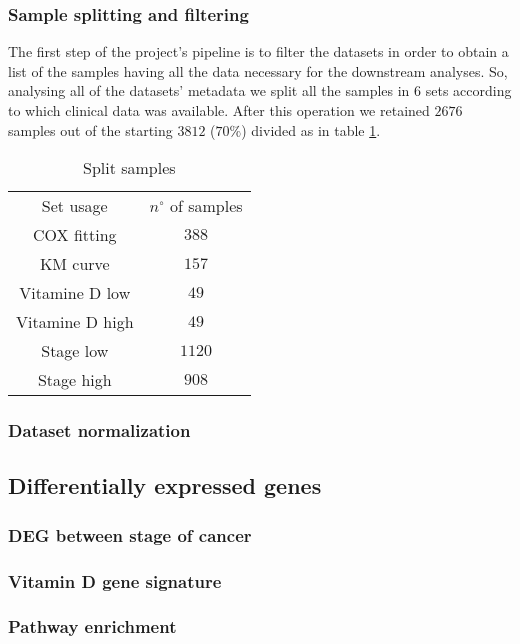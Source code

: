 \documentclass[fleqn,10pt]{SelfArx} %
\begin{document}
		\subsubsection{Sample splitting and filtering}
		The first step of the project's pipeline is to filter the datasets in order to obtain a list of the samples having all the data necessary for the downstream analyses.
		So, analysing all of the datasets' metadata we split all the samples in $6$ sets according to which clinical data was available.
		After this operation we retained $2676$ samples out of the starting $3812$ ($70\%$) divided as in table \ref{tab:samples_split}.

		\begin{table}[H]
			\centering
			\begin{tabular}{cc}
				\hline
				Set usage & $n^\circ$ of samples\\
				COX fitting & $388$\\
				KM curve & $157$\\
				Vitamine D low & $49$\\
				Vitamine D high & $49$\\
				Stage low & $1120$\\
				Stage high & $908$\\
				\hline
			\end{tabular}
			\caption{Split samples}
			\label{tab:samples_split}
		\end{table}

		\subsubsection{Dataset normalization}

	\subsection{Differentially expressed genes}

		\subsubsection{DEG between stage of cancer}

		\subsubsection{Vitamin D gene signature}

		\subsubsection{Pathway enrichment}
\end{document}
